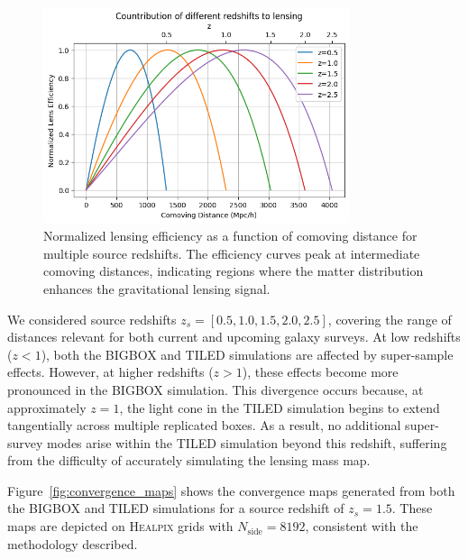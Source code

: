 \begin{figure}[ht]
    \centering
    \includegraphics[width=0.8\textwidth]{figures/lensefficiency.png}
    \caption[Normalized lensing efficiency for multiple source redshifts]{Normalized lensing efficiency as a function of comoving distance for multiple source redshifts. The efficiency curves peak at intermediate comoving distances, indicating regions where the matter distribution enhances the gravitational lensing signal.}
    \label{fig:lensing_efficiency}
\end{figure}

We considered source redshifts $z_s = [0.5, 1.0, 1.5, 2.0, 2.5]$, covering the range of distances relevant for both current and upcoming galaxy surveys. At low redshifts ($z < 1$), both the BIGBOX and TILED simulations are affected by super-sample effects. However, at higher redshifts ($z > 1$), these effects become more pronounced in the BIGBOX simulation. This divergence occurs because, at approximately $z = 1$, the light cone in the TILED simulation begins to extend tangentially across multiple replicated boxes. As a result, no additional super-survey modes arise within the TILED simulation beyond this redshift, suffering from the difficulty of accurately simulating the lensing mass map. 

Figure~\ref{fig:convergence_maps} shows the convergence maps generated from both the BIGBOX and TILED simulations for a source redshift of $z_s = 1.5$. These maps are depicted on \textsc{Healpix} grids with $N_{\text{side}} = 8192$, consistent with the methodology described.

